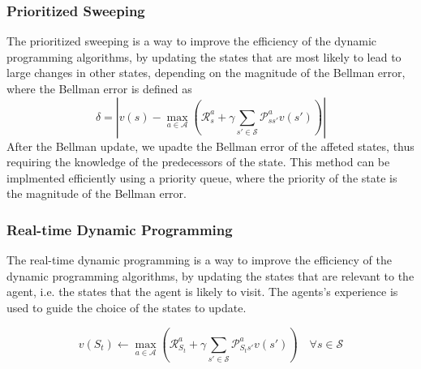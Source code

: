 \subsubsection*{Prioritized Sweeping}
The prioritized sweeping is a way to improve the efficiency of the dynamic programming algorithms,
by updating the states that are most likely to lead to large changes in other states, depending
on the magnitude of the Bellman error, where the Bellman error is defined as
\[
    \delta = \left \vert
        v(s) - \max_{a \in \mathcal{A}} \left(
        \mathcal{R}_{s}^{a} + \gamma \sum\limits_{s' \in \mathcal{S}} \mathcal{P}_{ss'}^{a} v(s')
    \right) \right \vert
\]
After the Bellman update, we upadte the Bellman error of the affeted states, thus requiring
the knowledge of the predecessors of the state. This method can be
implmented efficiently using a priority queue, where the priority of the state is the magnitude
of the Bellman error.

\subsubsection*{Real-time Dynamic Programming}
The real-time dynamic programming is a way to improve the efficiency of the dynamic programming
algorithms, by updating the states that are relevant to the agent, i.e. the states that the agent
is likely to visit. The agents's experience is used to guide the choice of the states to update.

\[
    v(S_t) \gets \max_{a \in \mathcal{A}} \left(
        \mathcal{R}_{S_t}^{a} + \gamma \sum\limits_{s' \in \mathcal{S}} 
        \mathcal{P}_{S_t s'}^{a} v(s')
    \right) \quad \forall s \in \mathcal{S}
\]

